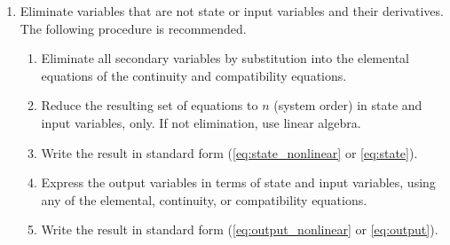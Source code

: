 \documentclass[dynamic_systems.tex]{subfiles}
\begin{document}
\begin{enumerate}
	\item Eliminate variables that are not state or input variables and their derivatives.
	The following procedure is recommended.
	\begin{enumerate}
		\item Eliminate all secondary variables by substitution into the elemental equations of the continuity and compatibility equations.
		\item Reduce the resulting set of equations to $n$ (system order) in state and input variables, only.
		If not elimination, use linear algebra.
		\item Write the result in standard form (\autoref{eq:state_nonlinear} or \autoref{eq:state}).
		\item Express the output variables in terms of state and input variables, using any of the elemental, continuity, or compatibility equations.
		\item Write the result in standard form (\autoref{eq:output_nonlinear} or \autoref{eq:output}).
	\end{enumerate}
\end{enumerate}
\end{document}
